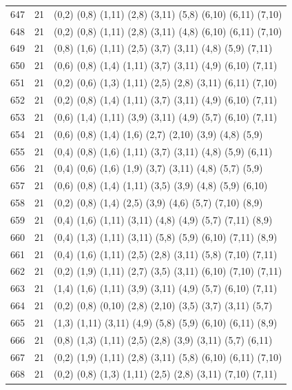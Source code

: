 \begin{appendix}
{\begin{longtable}{lll}
647& 21 & (0,2)   (0,8)  (1,11) (2,8)   (3,11)  (5,8)   (6,10)  (6,11)  (7,10)\\
648& 21 & (0,2)   (0,8)  (1,11) (2,8)   (3,11)  (4,8)   (6,10)  (6,11)  (7,10)\\
649& 21 & (0,8)   (1,6)  (1,11) (2,5)   (3,7)   (3,11)  (4,8)   (5,9)   (7,11)\\
650& 21 & (0,6)   (0,8)  (1,4)  (1,11)  (3,7)   (3,11)  (4,9)   (6,10)  (7,11)\\
651& 21 & (0,2)   (0,6)  (1,3)  (1,11)  (2,5)   (2,8)   (3,11)  (6,11)  (7,10)\\
652& 21 & (0,2)   (0,8)  (1,4)  (1,11)  (3,7)   (3,11)  (4,9)   (6,10)  (7,11)\\
653& 21 & (0,6)   (1,4)  (1,11) (3,9)   (3,11)  (4,9)   (5,7)   (6,10)  (7,11)\\
654& 21 & (0,6)   (0,8)  (1,4)  (1,6)   (2,7)   (2,10)  (3,9)   (4,8)   (5,9)\\
655& 21 & (0,4)   (0,8)  (1,6)  (1,11)  (3,7)   (3,11)  (4,8)   (5,9)   (6,11)\\
656& 21 & (0,4)   (0,6)  (1,6)  (1,9)   (3,7)   (3,11)  (4,8)   (5,7)   (5,9)\\
657& 21 & (0,6)   (0,8)  (1,4)  (1,11)  (3,5)   (3,9)   (4,8)   (5,9)   (6,10)\\
658& 21 & (0,2)   (0,8)  (1,4)  (2,5)   (3,9)   (4,6)   (5,7)   (7,10)  (8,9)\\
659& 21 & (0,4)   (1,6)  (1,11) (3,11)  (4,8)   (4,9)   (5,7)   (7,11)  (8,9)\\
660& 21 & (0,4)   (1,3)  (1,11) (3,11)  (5,8)   (5,9)   (6,10)  (7,11)  (8,9)\\
661& 21 & (0,4)   (1,6)  (1,11) (2,5)   (2,8)   (3,11)  (5,8)   (7,10)  (7,11)\\
662& 21 & (0,2)   (1,9)  (1,11) (2,7)   (3,5)   (3,11)  (6,10)  (7,10)  (7,11)\\
663& 21 & (1,4)   (1,6)  (1,11) (3,9)   (3,11)  (4,9)   (5,7)   (6,10)  (7,11)\\
664& 21 & (0,2)   (0,8)  (0,10) (2,8)   (2,10)  (3,5)   (3,7)   (3,11)  (5,7)\\
665& 21 & (1,3)   (1,11) (3,11) (4,9)   (5,8)   (5,9)   (6,10)  (6,11)  (8,9)\\
666& 21 & (0,8)   (1,3)  (1,11) (2,5)   (2,8)   (3,9)   (3,11)  (5,7)   (6,11)\\
667& 21 & (0,2)   (1,9)  (1,11) (2,8)   (3,11)  (5,8)   (6,10)  (6,11)  (7,10)\\
668& 21 & (0,2)   (0,8)  (1,3)  (1,11)  (2,5)   (2,8)   (3,11)  (7,10)  (7,11)\\

\end{longtable}}
\end{appendix}
